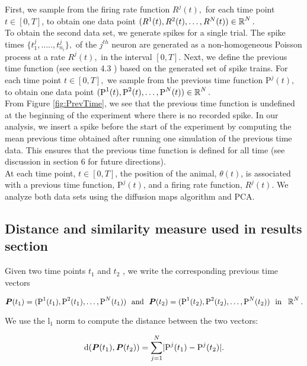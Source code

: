 First, we sample from the firing rate function  $R^{j}(t),$ for each time point $t \in [0, T]$,
to obtain one data point  $(R^{1}(t),  R^{2}(t),    \ldots , R^{N}(t) )  \in \operatorname{\mathbb{R}}^N.$ \\

To obtain the second data set, we generate spikes  for a single trial. The spike times $\{t_{1}^{j}, ....., t_{n_{i}}^{j} \},$  of the $j^{th}$ neuron are generated as a non-homogeneous Poisson process at a rate $R^{j}(t),$ in the interval $[0, T].$
Next, we define the previous time function (see section 4.3 )  based on the  generated set of  spike trains.  
For each time point $t \in [0, T],$ we sample from the previous time function $\text{P}^{j}(t),$ to obtain  one data point
$( \text{P}^{1}(t), \text{P}^{2}(t), \ldots, \text{P}^{N}(t) ) \in  \operatorname{\mathbb{R}}^N.$ \\

From Figure \ref{fig:PrevTime}, we  see that the previous time function is undefined at the beginning of the experiment where there is no recorded spike. In our analysis, we insert a spike before the start of the experiment by computing the mean previous time obtained after running  one simulation of  the previous time data. This ensures that the previous time function
is defined for all time (see discussion in section 6 for future directions). \\

At  each time point, $t  \in [0,T]$, the position of the animal, $\theta(t)$, is associated with a previous time function, $\text{P}^{j}(t)$, and a firing rate function, $R^{j}(t)$. We analyze both data sets using the diffusion maps algorithm  and  PCA.


\subsection{Distance  and similarity measure used in results section}
Given two time points $t_{1}$ and $t_{2}$ , we write the corresponding previous time vectors 

$$ \vect{P}(t_1)= (\text{P}^{1}(t_{1}), \text{P}^{2}(t_{1}), \ldots, \text{P}^{N}(t_{1}))   \  \ \text{and} \  \ 
 \vect{P}(t_{2}) = (\text{P}^{1}(t_{2}), \text{P}^{2}(t_{2}), \ldots, \text{P}^{N}(t_{2}))  \  \ \text{in} \  \  \R^{N}.$$

We use the l$_{1}$ norm to compute the distance between the two vectors:

\begin{equation}\label{distPrevtime}
\text{d}(\boldsymbol{P}(t_{1}), \boldsymbol{P}(t_{2}) ) = 
\displaystyle \sum_{j=1}^{N} \lvert \text{P}^{j}(t_{1}) - \text{P}^{j}(t_{2})   \rvert.
\end{equation}

